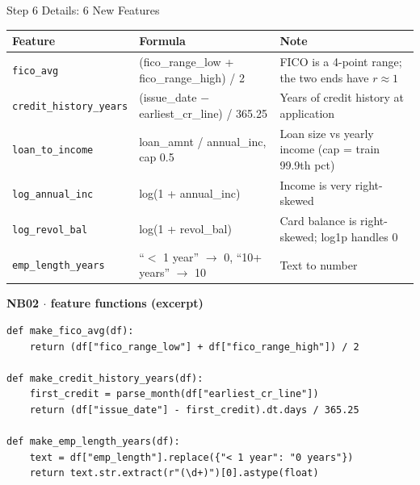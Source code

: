 \documentclass{beamer}
\newcommand{\code}[1]{\texttt{\small #1}}
\begin{document}
\begin{frame}[fragile]{Step 6 Details: 6 New Features}
  \begin{table}
    \centering
    \tiny
    \begin{tabular}{lll}
      \hline
      \textbf{Feature} & \textbf{Formula} & \textbf{Note}\\
      \hline
      \code{fico\_avg} & (fico\_range\_low + fico\_range\_high) / 2 & FICO is a 4-point range; the two ends have $r\approx1$\\
      \code{credit\_history\_years} & (issue\_date $-$ earliest\_cr\_line) / 365.25 & Years of credit history at application\\
      \code{loan\_to\_income} & loan\_amnt / annual\_inc, cap 0.5 & Loan size vs yearly income (cap = train 99.9th pct)\\
      \code{log\_annual\_inc} & log(1 + annual\_inc) & Income is very right-skewed\\
      \code{log\_revol\_bal} & log(1 + revol\_bal) & Card balance is right-skewed; log1p handles 0\\
      \code{emp\_length\_years} & ``$<$ 1 year'' $\to$ 0, ``10+ years'' $\to$ 10 & Text to number\\
      \hline
    \end{tabular}
  \end{table}
  \textbf{\scriptsize NB02 $\cdot$ feature functions (excerpt)}
\begin{lstlisting}
def make_fico_avg(df):
    return (df["fico_range_low"] + df["fico_range_high"]) / 2

def make_credit_history_years(df):
    first_credit = parse_month(df["earliest_cr_line"])
    return (df["issue_date"] - first_credit).dt.days / 365.25

def make_emp_length_years(df):
    text = df["emp_length"].replace({"< 1 year": "0 years"})
    return text.str.extract(r"(\d+)")[0].astype(float)
\end{lstlisting}
\end{frame}
\end{document}
